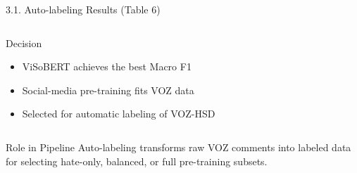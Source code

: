 \documentclass[11pt, aspectratio=169]{beamer}
\begin{document}
\begin{frame}[fragile, shrink=20]{3.1. Auto-labeling Results (Table 6)}

\begin{columns}[T]
  \begin{table}[h]
    \centering
    \caption{Automatic labeling results on ViHSD binary setting}
    \vspace{0.2cm}
  \end{table}

  \begin{block}{Decision}
    \begin{itemize}
      \item ViSoBERT achieves the best Macro F1
      \item Social-media pre-training fits VOZ data
      \item Selected for automatic labeling of VOZ-HSD
    \end{itemize}
  \end{block}
\end{columns}

\vspace{0.2cm}
\begin{block}{Role in Pipeline}
  Auto-labeling transforms raw VOZ comments into labeled data for selecting hate-only, balanced, or full pre-training subsets.
\end{block}
\end{frame}
\end{document}

